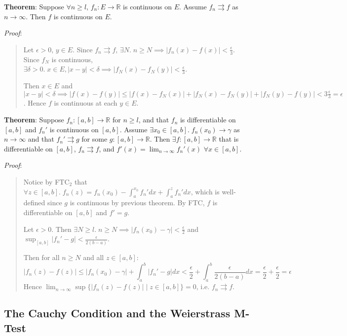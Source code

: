 \documentclass[11pt]{article}
\begin{document}
\textbf{Theorem}: Suppose $\forall n \geq l$, $f_n : E \to \mathbb{R}$ is continuous on $E$. Assume $f_n \rightrightarrows f$ as $n \to \infty$. Then $f$ is continuous on $E$.

\emph{Proof}:
\begin{quote}\vspace{-0.3cm}
Let $\epsilon > 0$, $y \in E$. Since $f_n \rightrightarrows f$, $\exists N.\; n \geq N \implies |f_n(x) - f(x)| < \frac{\epsilon}{3}$. Since $f_N$ is continuous, $\exists \delta > 0.\; x \in E, |x-y| < \delta \implies |f_N(x) - f_N(y)| < \frac{\epsilon}{3}$.

Then $x \in E$ and $|x-y| < \delta \implies |f(x) - f(y)| \leq |f(x) - f_N(x)| + |f_N(x) - f_N(y)| + |f_N(y) - f(y)| < 3 \frac{\epsilon}{3} = \epsilon$. Hence $f$ is continuous at each $y \in E$.
\end{quote}

\textbf{Theorem}: Suppose $f_n : [a,b] \to \mathbb{R}$ for $n \geq l$, and that $f_n$ is differentiable on $[a,b]$ and $f_n'$ is continuous on $[a,b]$. Assume $\exists x_0 \in [a,b].\; f_n(x_0) \to \gamma$ as $n \to \infty$ and that $f_n' \rightrightarrows g$ for some $g : [a,b] \to \mathbb{R}$. Then $\exists f : [a,b] \to \mathbb{R}$ that is differentiable on $[a,b]$, $f_n \rightrightarrows f$, and $f'(x) = \lim_{n \to \infty} f_n'(x)$ $\forall x \in [a,b]$.

\emph{Proof}:
\begin{quote}\vspace{-0.3cm}
Notice by FTC$_2$ that $\forall z \in [a,b].\; f_n(z) = f_n(x_0) - \int_a^{x_0} f_n' dx + \int_a^z f_n' dx$, which is well-defined since $g$ is continuous by previous theorem. By FTC, $f$ is differentiable on $[a,b]$ and $f' = g$.

Let $\epsilon > 0$. Then $\exists N \geq l.\; n \geq N \implies |f_n(x_0) - \gamma| < \frac{\epsilon}{2}$ and $\sup_{[a,b]} |f_n' - g| < \frac{\epsilon}{2(b-a)}$.

Then for all $n \geq N$ and all $z \in [a,b]$:
\begin{displaymath}
|f_n(z) - f(z)| \leq |f_n(x_0) - \gamma| + \int_a^b |f_n' - g| dx < \frac{\epsilon}{2} + \int_a^b \frac{\epsilon}{2(b-a)} dx = \frac{\epsilon}{2} + \frac{\epsilon}{2} = \epsilon
\end{displaymath}
Hence $\lim_{n \to \infty} \sup\{|f_n(z) - f(z)| \mid z \in [a,b]\} = 0$, i.e. $f_n \rightrightarrows f$.
\end{quote}

\subsection{The Cauchy Condition and the Weierstrass M-Test}
\end{document}

